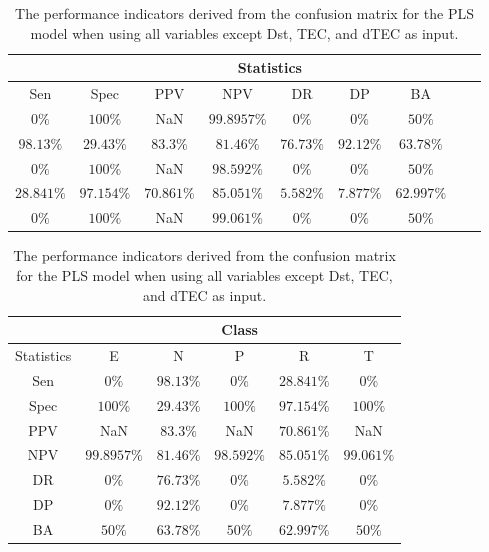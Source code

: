 \begin{table}[!ht]
	\centering
	\begin{tabular}{|c|c|c|c|c|c|c|c|c|}
		\hline
		 & \multicolumn{7}{c|}{Statistics} \\ \hline
		Sen & Spec & PPV & NPV & DR & DP & BA \\ \hline
		$0\%$ & $100\%$ & NaN & $99.8957\%$ & $0\%$ & $0\%$ & $50\%$ \\ \hline
		$98.13\%$ & $29.43\%$ & $83.3\%$ & $81.46\%$ & $76.73\%$ & $92.12\%$ & $63.78\%$ \\ \hline
		$0\%$ & $100\%$ & NaN & $98.592\%$ & $0\%$ & $0\%$ & $50\%$ \\ \hline
		$28.841\%$ & $97.154\%$ & $70.861\%$ & $85.051\%$ & $5.582\%$ & $7.877\%$ & $62.997\%$ \\ \hline
		$0\%$ & $100\%$ & NaN & $99.061\%$ & $0\%$ & $0\%$ & $50\%$ \\ \hline
	\end{tabular}
	\caption{The performance indicators derived from the confusion matrix for the PLS model when using all variables except Dst, TEC, and dTEC as input.}
	\label{tab:cs:noTEC:pls}
\end{table}

\begin{table}[!ht]
	\centering
	\begin{tabular}{|c|c|c|c|c|c|}
		\hline
		 & \multicolumn{5}{c|}{Class} \\ \hline
		Statistics & E & N & P & R & T \\ \hline
		Sen & $0\%$ & $98.13\%$ & $0\%$ & $28.841\%$ & $0\%$ \\ \hline
		Spec & $100\%$ & $29.43\%$ & $100\%$ & $97.154\%$ & $100\%$ \\ \hline
		PPV & NaN & $83.3\%$ & NaN & $70.861\%$ & NaN \\ \hline
		NPV & $99.8957\%$ & $81.46\%$ & $98.592\%$ & $85.051\%$ & $99.061\%$ \\ \hline
		DR & $0\%$ & $76.73\%$ & $0\%$ & $5.582\%$ & $0\%$ \\ \hline
		DP & $0\%$ & $92.12\%$ & $0\%$ & $7.877\%$ & $0\%$ \\ \hline
		BA & $50\%$ & $63.78\%$ & $50\%$ & $62.997\%$ & $50\%$ \\ \hline
	\end{tabular}
	\caption{The performance indicators derived from the confusion matrix for the PLS model when using all variables except Dst, TEC, and dTEC as input.}
	\label{tab:cs:reverse:noTEC:pls}
\end{table}

